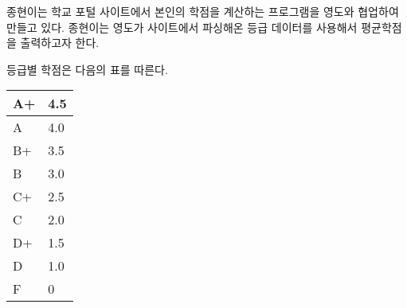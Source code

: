 종현이는 학교 포털 사이트에서 본인의 학점을 계산하는 프로그램을 영도와 협업하여 만들고 있다. 종현이는 영도가 사이트에서 파싱해온 등급 데이터를 사용해서 평균학점을 출력하고자 한다. 

등급별 학점은 다음의 표를 따른다.

\begin{table}
\begin{tabular}{|l|l|}
\hline
A+ & 4.5 \\ \hline
A  & 4.0 \\ \hline
B+ & 3.5 \\ \hline
B  & 3.0 \\ \hline
C+ & 2.5 \\ \hline
C  & 2.0 \\ \hline
D+ & 1.5 \\ \hline
D  & 1.0 \\ \hline
F  & 0   \\ \hline
\end{tabular}
\end{table}
